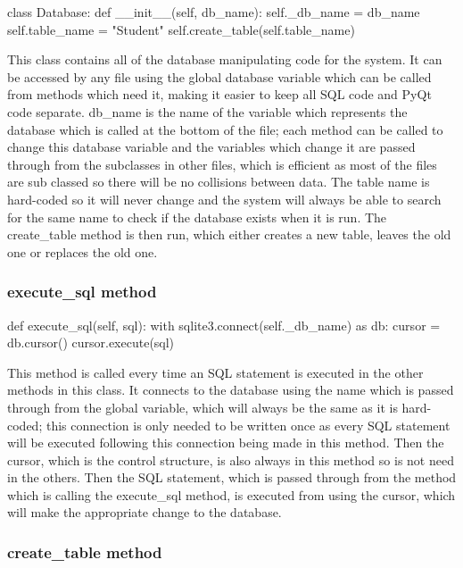 \begin{python}
class Database:
    def __init__(self, db_name):
        self._db_name = db_name
        self.table_name = "Student"
        self.create_table(self.table_name)
\end{python}

This class contains all of the database manipulating code for the system. It can be accessed by any file using the global database variable which can be called from methods which need it, making it easier to keep all SQL code and PyQt code separate. db\_name is the name of the variable which represents the database which is called at the bottom of the file; each method can be called to change this database variable and the variables which change it are passed through from the subclasses in other files, which is efficient as most of the files are sub classed so there will be no collisions between data. The table name is hard-coded so it will never change and the system will always be able to search for the same name to check if the database exists when it is run. The create\_table method is then run, which either creates a new table, leaves the old one or replaces the old one.

\subsubsection{execute\_sql method}

\begin{python}
def execute_sql(self, sql):
     with sqlite3.connect(self._db_name) as db:
         cursor = db.cursor()
         cursor.execute(sql)
\end{python}

This method is called every time an SQL statement is executed in the other methods in this class. It connects to the database using the name which is passed through from the global variable, which will always be the same as it is hard-coded; this connection is only needed to be written once as every SQL statement will be executed following this connection being made in this method. Then the cursor, which is the control structure, is also always in this method so is not need in the others. Then the SQL statement, which is passed through from the method which is calling the execute\_sql method, is executed from using the cursor, which will make the appropriate change to the database.

\subsubsection{create\_table method}

